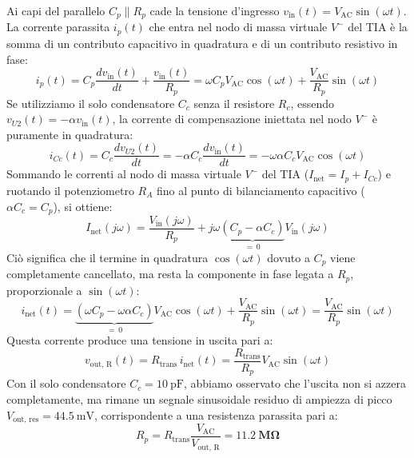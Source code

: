 \documentclass[11pt,a4paper]{article}
\begin{document}
\noindent Ai capi del parallelo $C_p \parallel R_p$ cade la tensione d'ingresso $v_{\text{in}}(t) = V_{\text{AC}} \sin(\omega t)$. La corrente parassita $i_p(t)$ che entra nel nodo di massa virtuale $V^-$ del TIA è la somma di un contributo capacitivo in quadratura e di un contributo resistivo in fase:
\begin{equation}
    \label{eq:ip_scomposiz}
    i_p(t) = C_p \frac{dv_{\text{in}}(t)}{dt} + \frac{v_{\text{in}}(t)}{R_p} = \omega C_p V_{\text{AC}} \cos(\omega t) + \frac{V_{\text{AC}}}{R_p} \sin(\omega t)
\end{equation}
Se utilizziamo il solo condensatore $C_c$ senza il resistore $R_c$, essendo $v_{U2}(t) = -\alpha v_{\text{in}}(t)$, la corrente di compensazione iniettata nel nodo $V^-$ è puramente in quadratura:
\begin{equation}
    i_{Cc}(t) = C_c \frac{dv_{U2}(t)}{dt} = -\alpha C_c \frac{dv_{\text{in}}(t)}{dt} = -\omega \alpha C_c V_{\text{AC}} \cos(\omega t)
\end{equation}
Sommando le correnti al nodo di massa virtuale $V^-$ del TIA ($I_{\text{net}} = I_p + I_{Cc}$) e ruotando il potenziometro $R_A$ fino al punto di bilanciamento capacitivo ($\alpha C_c = C_p$), si ottiene:
\begin{equation}
    I_{\text{net}}(j\omega) = \frac{V_{\text{in}}(j\omega)}{R_p} + j\omega \underbrace{\left( C_p - \alpha C_c \right)}_{= \, 0} V_{\text{in}}(j\omega)
\end{equation}
Ciò significa che il termine in quadratura $\cos(\omega t)$ dovuto a $C_p$ viene completamente cancellato, ma resta la componente in fase legata a $R_p$, proporzionale a $\sin(\omega t)$:
\begin{equation}
    i_{\text{net}}(t) = \underbrace{\left( \omega C_p - \omega \alpha C_c \right)}_{= \, 0} V_{\text{AC}} \cos(\omega t) + \frac{V_{\text{AC}}}{R_p} \sin(\omega t) = \frac{V_{\text{AC}}}{R_p} \sin(\omega t)
\end{equation}
Questa corrente produce una tensione in uscita pari a:
\begin{equation}
    v_{\text{out, R}}(t) = R_{\text{trans}} \, i_{\text{net}}(t) = \frac{R_{\text{trans}}}{R_p} V_{\text{AC}} \sin(\omega t)
\end{equation}
Con il solo condensatore $C_c = \SI{10}{\pico\farad}$, abbiamo osservato che l'uscita non si azzera completamente, ma rimane un segnale sinusoidale residuo di ampiezza di picco $V_{\text{out, res}} = \SI{44.5}{\milli\volt}$, corrispondente a una resistenza parassita pari a:
\begin{equation}
    \label{eq:stima_rp_mems}
    R_p = R_{\text{trans}} \frac{V_{\text{AC}}}{V_{\text{out, R}}} = \mathbf{\SI{11.2}{\mega\ohm}}
\end{equation}
\end{document}
